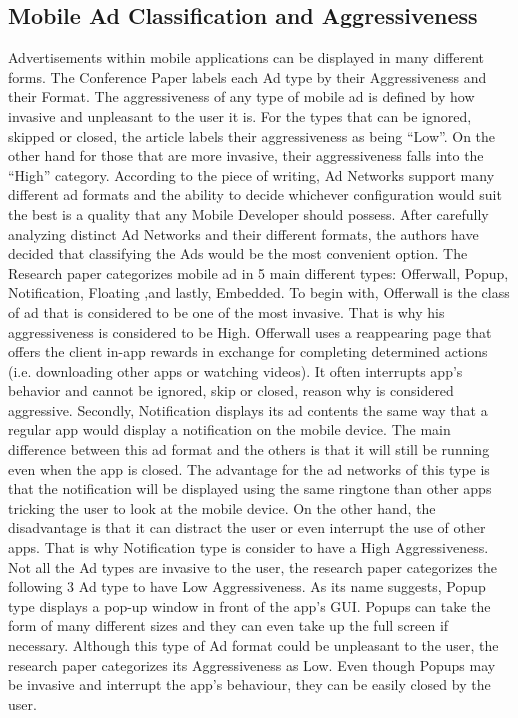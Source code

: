 \documentclass[conference]{IEEEtran}
\begin{document}
\subsection{Mobile Ad Classification and Aggressiveness}
Advertisements within mobile applications can be displayed in many different forms. The Conference Paper labels each Ad type by their Aggressiveness and their Format. The aggressiveness of any type of mobile ad is defined by how invasive and unpleasant to the user it is. For the types that can be ignored, skipped or closed, the article labels their aggressiveness as being “Low”. On the other hand for those that are more invasive, their aggressiveness falls into the “High” category. According to the piece of writing, Ad Networks support many different ad formats and the ability to decide whichever configuration would suit the best is a quality that any Mobile Developer should possess. After carefully analyzing distinct Ad Networks and their different formats, the authors have decided that classifying the Ads would be the most convenient option. The Research paper categorizes mobile ad in 5 main different types: Offerwall, Popup, Notification, Floating ,and lastly, Embedded.
To begin with, Offerwall is the class of ad that is considered to be one of the most invasive. That is why his aggressiveness is considered to be High. Offerwall uses a reappearing page that offers the client in-app rewards in exchange for completing determined actions (i.e. downloading other apps or watching videos). It often interrupts app’s behavior and cannot be ignored, skip or closed, reason why is considered aggressive. 
Secondly, Notification displays its ad contents the same way that a regular app would display a notification on the mobile device. The main difference between this ad format and the others is that it will still be running even when the app is closed. The advantage for the ad networks of this type is that the notification will be displayed using the same ringtone than other apps tricking the user to look at the mobile device. On the other hand, the disadvantage is that it can distract the user or even interrupt the use of other apps. That is why Notification type is consider to have a High Aggressiveness.
Not all the Ad types are invasive to the user, the research paper categorizes the following 3 Ad type to have Low Aggressiveness.
As its name suggests, Popup type displays a pop-up window in front of the app’s GUI. Popups can take the form of many different sizes and they can even take up the full screen if necessary. Although this type of Ad format could be unpleasant to the user, the research paper categorizes its Aggressiveness as Low. Even though Popups may be invasive and interrupt the app’s behaviour, they can be easily closed by the user. 
\end{document}
